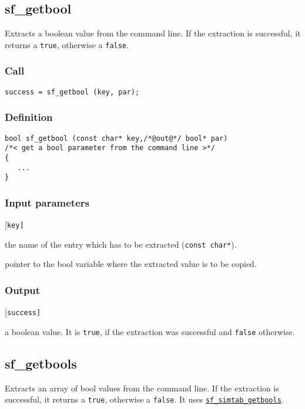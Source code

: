 \subsection{{sf\_getbool}}
Extracts a boolean value from the command line. If the extraction is successful, it returns a \texttt{true}, otherwise a \texttt{false}. 

\subsubsection*{Call}
\begin{verbatim}success = sf_getbool (key, par);\end{verbatim}

\subsubsection*{Definition}
\begin{verbatim}
bool sf_getbool (const char* key,/*@out@*/ bool* par)
/*< get a bool parameter from the command line >*/
{
   ...
}
\end{verbatim}

\subsubsection*{Input parameters}
\begin{desclist}{\tt }{\quad}[\tt key]
   \setlength\itemsep{0pt}
   \item[key] the name of the entry which has to be extracted (\texttt{const char*}).
   \item[par] pointer to the bool variable where the extracted value is to be copied.
\end{desclist}

\subsubsection*{Output}
\begin{desclist}{\tt }{\quad}[\tt success]
   \setlength\itemsep{0pt}
   \item[success]  a boolean value. It is \texttt{true}, if the extraction was successful and \texttt{false} otherwise.
\end{desclist}




\subsection{{sf\_getbools}}
Extracts an array of bool values from the command line. If the extraction is successful, it returns a \texttt{true}, otherwise a \texttt{false}. It uses \hyperref[sec:sf_simtab_getbools]{\texttt{sf\_simtab\_getbools}}.


